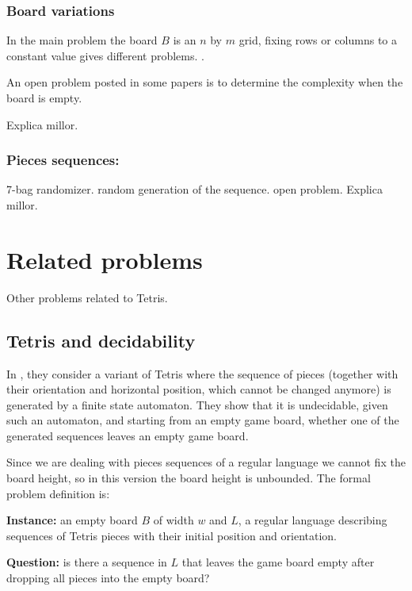 \subsubsection{Board variations}

In the main problem the board $B$ is an $n$ by $m$ grid, fixing rows or columns to a constant value gives different problems. \cite{TCB}.


An open problem posted in some papers is to determine the complexity when the board is empty.

Explica millor.

\subsubsection{Pieces sequences:}

7-bag randomizer. random generation of the sequence. open problem. Explica millor.


\section{Related problems}

Other problems related to Tetris.

\subsection{Tetris and decidability}

In \cite{TAD}, they consider a variant of Tetris where the sequence of pieces (together with their orientation and horizontal position, which cannot be changed anymore) is generated by a finite state automaton. They show that it is undecidable, given such an automaton, and starting from an empty game board, whether one of the generated sequences leaves an empty game board.

Since we are dealing with pieces sequences of a regular language we cannot fix the board height, so in this version the board height is unbounded. The formal problem definition is:

\vspace{1em}
\textbf{Instance:} an empty board $B$ of width $w$ and $L$, a regular language describing sequences of Tetris pieces with their initial position and orientation. 

\textbf{Question:} is there a sequence in $L$ that leaves the game board empty after dropping all pieces into the empty board?
\vspace{1em}


